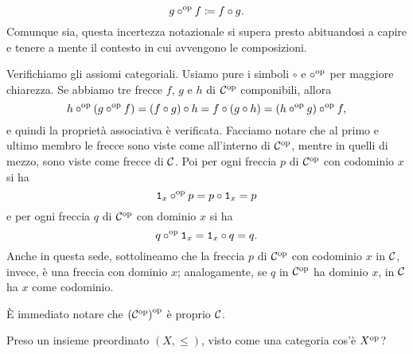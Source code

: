 \begin{costruzione}
\begin{itemize}
\[g \circ^\text{op} f \coloneq f \circ g .\]
Comunque sia, questa incertezza notazionale si supera presto abituandosi a capire e tenere a mente il contesto in cui avvengono le composizioni.
\end{itemize}
%
Verifichiamo gli assiomi categoriali. Usiamo pure i simboli \(\circ\) e \(\circ^\text{op}\) per maggiore chiarezza. Se abbiamo tre frecce \(f\), \(g\) e \(h\) di \(\mathcal C^\text{op}\) componibili, allora
\[h \circ^\text{op} (g \circ^\text{op} f) = (f \circ g) \circ h = f \circ (g \circ h) = (h \circ^\text{op} g) \circ^\text{op} f ,\]
e quindi la proprietà associativa è verificata. Facciamo notare che al primo e ultimo membro le frecce sono viste come all'interno di \(\mathcal C^\text{op}\), mentre in quelli di mezzo, sono viste come frecce di \(\mathcal C\). Poi per ogni freccia \(p\) di \(\mathcal C^\text{op}\) con codominio \(x\) si ha
\[\mathtt{1}_x \circ^\text{op} p = p \circ \mathtt{1}_x = p\]
e per ogni freccia \(q\) di \(\mathcal C^\text{op}\) con dominio \(x\) si ha
\[q \circ^\text{op} \mathtt{1}_x = \mathtt{1}_x \circ q = q .\]
Anche in questa sede, sottolineamo che la freccia \(p\) di \(\mathcal C^\text{op}\) con codominio \(x\) in \(\mathcal C\), invece, è una freccia con dominio \(x\); analogamente, se \(q\) in \(\mathcal C^\text{op}\) ha dominio \(x\), in \(\mathcal C\) ha \(x\) come codominio.
\end{costruzione}

\begin{nota}
È immediato notare che \(\left(\mathcal C^\text{op}\right)^\text{op}\) è proprio \(\mathcal C\).
\end{nota}

\begin{esercizio}
Preso un insieme preordinato \((X, \leqslant)\), visto come una categoria cos'è \(X^\text{op}\)?
\end{esercizio}

